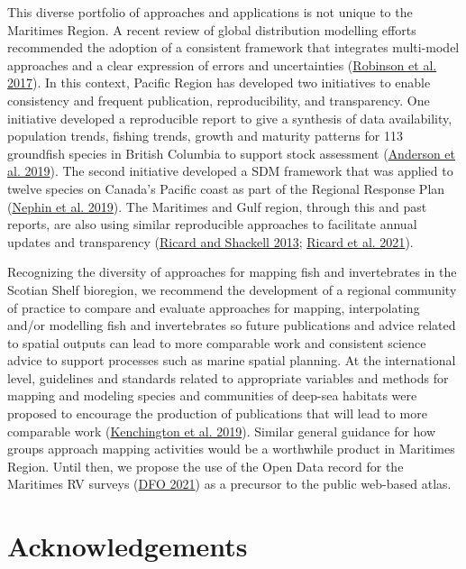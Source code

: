 \documentclass[12pt]{article}\usepackage[]{graphicx}\usepackage[]{color}
\begin{document}
This diverse portfolio of approaches and applications is not unique to the Maritimes Region. A recent review of global distribution modelling efforts recommended the adoption of a consistent framework that integrates multi-model approaches and a clear expression of errors and uncertainties (\protect\hyperlink{ref-Robinson:2017}{Robinson et al. 2017}). In this context, Pacific Region has developed two initiatives to enable consistency and frequent publication, reproducibility, and transparency. One initiative developed a reproducible report to give a synthesis of data availability, population trends, fishing trends, growth and maturity patterns for 113 groundfish species in British Columbia to support stock assessment (\protect\hyperlink{ref-Anderson:2019}{Anderson et al. 2019}). The second initiative developed a SDM framework that was applied to twelve species on Canada's Pacific coast as part of the Regional Response Plan (\protect\hyperlink{ref-Nephin:2019}{Nephin et al. 2019}). The Maritimes and Gulf region, through this and past reports, are also using similar reproducible approaches to facilitate annual updates and transparency (\protect\hyperlink{ref-Ricard:MARatlas:2013}{Ricard and Shackell 2013}; \protect\hyperlink{ref-Ricard:GULFatlas:2021}{Ricard et al. 2021}).

Recognizing the diversity of approaches for mapping fish and invertebrates in the Scotian Shelf bioregion, we recommend the development of a regional community of practice to compare and evaluate approaches for mapping, interpolating and/or modelling fish and invertebrates so future publications and advice related to spatial outputs can lead to more comparable work and consistent science advice to support processes such as marine spatial planning. At the international level, guidelines and standards related to appropriate variables and methods for mapping and modeling species and communities of deep-sea habitats were proposed to encourage the production of publications that will lead to more comparable work (\protect\hyperlink{ref-Kenchington2019}{Kenchington et al. 2019}). Similar general guidance for how groups approach mapping activities would be a worthwhile product in Maritimes Region. Until then, we propose the use of the Open Data record for the Maritimes RV surveys (\protect\hyperlink{ref-OpenData_MAR_RV}{DFO 2021}) as a precursor to the public web-based atlas.

\hypertarget{acknowledgements}{%
\section{Acknowledgements}\label{acknowledgements}}
\end{document}
